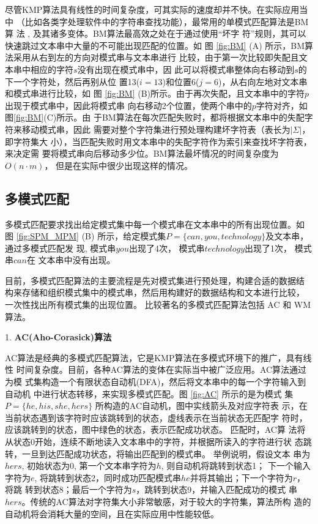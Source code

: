 尽管KMP算法具有线性的时间复杂度，可其实际的速度却并不快。在实际应用当中
（比如各类字处理软件中的字符串查找功能），最常用的单模式匹配算法是BM算
法 \cite{Boyer1977}, 及其诸多变体。BM算法最高效之处在于通过使用“坏字
符”规则，其可以快速跳过文本串中大量的不可能出现匹配的位置。如
图 \ref{fig:BM} (A) 所示，BM算法采用从右到左的方向对模式串与文本串进行
比较，由于第一次比较即失配且文本串中相应的字符$s$没有出现在模式串中，因
此可以将模式串整体向右移动到$s$的下一个字符处，然后再别从位
置13($i=13$)和位置6($j=6$)，从右向左地对文本串和模式串进行比较，如
图 \ref{fig:BM}
(B)所示。由于再次失配，且文本串中的字符$p$出现于模式串中，因此将模式串
向右移动2个位置，使两个串中的$p$字符对齐，如图\ref{fig:BM}(C)所示。由
于BM算法在每次匹配失败时，都将根据文本串中的失配字符来移动模式串，因此
需要对整个字符集进行预处理构建坏字符表（表长为$|\Sigma|$，即字符集大
小），当匹配失败时用文本串中的失配字符作为索引来查找坏字符表，来决定需
要将模式串向后移动多少位。BM算法最坏情况的时间复杂度为$O(n \cdot m)$，
但是在实际中很少出现这样的情况。

\subsection{多模式匹配}

多模式匹配要求找出给定模式集中每一个模式串在文本串中的所有出现位置。如
图 \ref{fig:SPM_MPM} (B)
所示，给定模式集$P=\{can, you, technology\}$及文本串，通过多模式匹配发
现, 模式串$you$出现了4次， 模式串$technology$出现了1次， 模式串$can$在
文本串中没有出现。

目前，多模式匹配算法的主要流程是先对模式集进行预处理，构建合适的数据结
构来存储和组织模式集中的模式串，然后用构建好的数据结构和文本进行比较，
一次性找出所有模式集的出现位置。 比较著名的多模式匹配算法包括 AC
\cite{Aho1975} 和 WM \cite{Wu1994} 算法。

1. \textbf{AC(Aho-Corasick)算法}

AC算法是经典的多模式匹配算法，它是KMP算法在多模式环境下的推广，具有线性
时间复杂度。目前，各种AC算法的变体在实际当中被广泛应用。AC算法通过为模
式集构造一个有限状态自动机(DFA)，然后将文本串中的每一个字符输入到自动机
中进行状态转移，来实现多模式匹配。图 \ref{fig:AC} 所示的是为模式
集$P=\{he, his, she, hers\}$ 所构造的AC自动机，图中实线箭头及对应字符表
示，在当前状态遇到该字符时应该跳转到的状态，虚线表示在当前状态无匹配字
符时，应该跳转到的状态，图中绿色的状态，表示匹配成功状态。 匹配时，AC算
法将从状态0开始，连续不断地读入文本串中的字符，并根据所读入的字符进行状
态跳转，一旦到达匹配成功状态，将输出匹配到的模式串。 举例说明，假设文本
串为$hers$, 初始状态为0, 第一个文本串字符为$h$, 则自动机将跳转到状态1；
下一个输入字符为$e$,
将跳转到状态2，同时成功匹配模式串$he$并将其输出；下一个字符为$r$，将跳
转到状态8；最后一个字符为$s$，跳转到状态9，并输入匹配成功的模式
串$hers$。传统的AC算法对字符集大小非常敏感，对于较大的字符集，算法所构
造的自动机将会消耗大量的空间，且在实际应用中性能较低。


